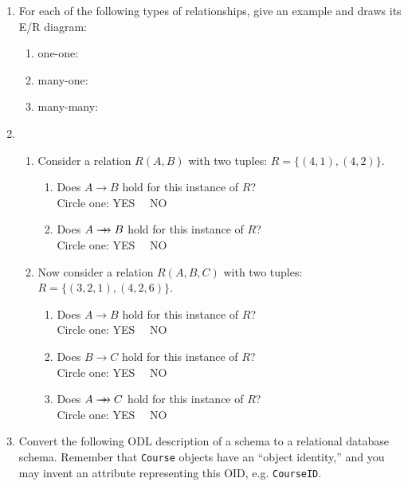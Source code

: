 {{\begin{enumerate}
\newpage
\item For each of the following types of relationships, give an
	example and draws its E/R diagram:
    \begin{enumerate}
	\item one-one:
	\vspace{1.2in}
	\item many-one:
	\vspace{1.2in}
	\item many-many:
	\vspace{1.2in}
    \end{enumerate}
\item 
  \begin{enumerate}
    \item Consider a relation $R(A,B)$ with two tuples: $R=\{(4,1),(4,2)\}$.
    \begin{enumerate}
	\item Does $A\rightarrow B$ hold for this instance of $R$?\\
	    \smallskip
	    Circle one: YES \ \ NO
	    \bigskip
	\item Does $A\rightarrow\!\hspace{-0.5em}\rightarrow B$ hold for 
	    this instance of $R$?\\
	    \smallskip
	    Circle one: YES \ \ NO
	    \bigskip
	    \bigskip
    \end{enumerate}
    \item Now consider a relation $R(A,B,C)$ with two tuples:
    $R = \{(3,2,1), (4,2,6)\}$.
    \begin{enumerate}
	\item Does $A\rightarrow B$ hold for this instance of $R$?\\
	    \smallskip
	    Circle one: YES \ \ NO
	    \bigskip
	\item Does $B\rightarrow C$ hold for this instance of $R$?\\
	    \smallskip
	    Circle one: YES \ \ NO
	    \bigskip
	\item Does $A\rightarrow\!\hspace{-0.5em}\rightarrow C$ 
	    hold for this instance of $R$?\\
	    \smallskip
	    Circle one: YES \ \ NO
	    \bigskip
	    \bigskip
	    \bigskip
    \end{enumerate}
    \end{enumerate}

\newpage
\item Convert the following ODL description of a schema to a relational
database schema.  Remember that {\tt Course} objects have an ``object
identity,'' and you may invent an attribute representing this OID, 
e.g. {\tt CourseID}.  


\end{enumerate}}}
